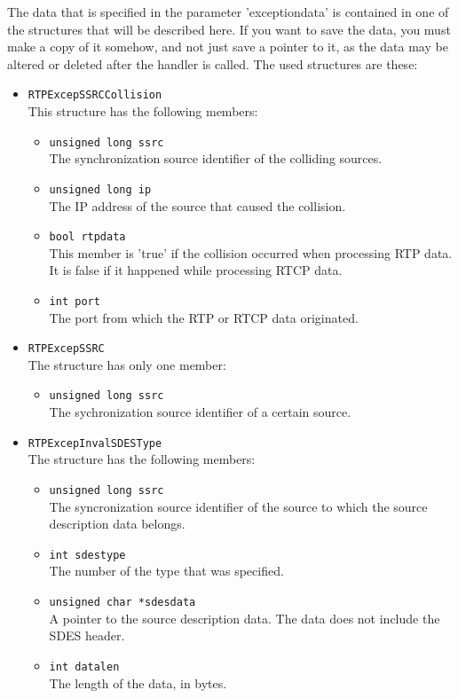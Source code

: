 The data that is specified in the parameter 'exceptiondata' is contained in
one of the structures that will be described here. If you want to save the
data, you must make a copy of it somehow, and not just save a pointer to it,
as the data may be altered or deleted after the handler is called. The used
structures are these:
\begin{itemize}

\item {\tt RTPExcepSSRCCollision}\\
	This structure has the following members:
		\begin{itemize}
		
		\item {\tt unsigned long ssrc}\\
			The synchronization source identifier of the colliding
			sources.
		\item {\tt unsigned long ip}\\
			The IP address of the source that caused the collision.
		\item {\tt bool rtpdata}\\
			This member is 'true' if the collision occurred when
			processing RTP data. It is false if it happened while
			processing RTCP data.
		\item {\tt int port}\\
			The port from which the RTP or RTCP data originated.
		\end{itemize}
		
\item {\tt RTPExcepSSRC}\\
	The structure has only one member:
		\begin{itemize}
		\item {\tt unsigned long ssrc}\\
			The sychronization source identifier of a certain source.
		\end{itemize}

\item {\tt RTPExcepInvalSDESType}\\
	The structure has the following members:
		\begin{itemize}
		\item {\tt unsigned long ssrc}\\
			The syncronization source identifier of the source to
			which the source description data belongs.
		\item {\tt int sdestype}\\
			The number of the type that was specified.
		\item {\tt unsigned char *sdesdata}\\
			A pointer to the source description data. The data does
			not include the SDES header.
		\item {\tt int datalen}\\
			The length of the data, in bytes.
		\end{itemize}
		

\end{itemize}
